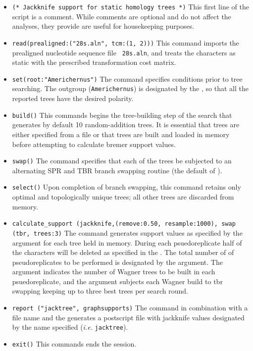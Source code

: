 \begin{itemize}
\item \texttt{(* Jackknife support for static homology trees *)} This first line of the script is a comment. While comments are optional and do not affect the analyses, they provide are useful for housekeeping purposes.
\item \texttt{read(prealigned:("28s.aln", tcm:(1, 2)))} This command imports the prealigned nucleotide sequence file \texttt{ 28s.aln}, and treats the characters as static with the prescribed transformation cost matrix.
\item \texttt{set(root:"Americhernus")} The  command specifies conditions prior to tree searching. The outgroup (\texttt{Americhernus}) is designated by the , so that all the reported trees have the desired polarity.     
\item \texttt{build()} This commands begins the tree-building step of the search that generates by default 10 random-addition trees.  It is essential that trees are either specified from a file or that trees are built and loaded in memory before attempting to calculate bremer support values.
\item \texttt{swap()} The  command specifies that each of the trees be subjected to an alternating SPR and TBR branch swapping routine (the default of \poy).
\item \texttt{select()} Upon completion of branch swapping, this command retains only optimal and topologically unique trees; all other trees are discarded from memory. 
\item \texttt{calculate\_support (jackknife,(remove:0.50, resample:1000), swap (tbr, trees:3)} The  command generates support values as specified by the  argument for each tree held in memory.  During each psuedoreplicate half of the characters will be deleted as specified in the .  The total number of of pseudoreplicates to be performed is designated by the  argument. The  argument indicates the number of Wagner trees to be built in each psuedoreplicate, and the  argument subjects each Wagner build to tbr swapping keeping up to three best trees per search round. 
\item \texttt{report ("jacktree", graphsupports)}  The  command in combination with a file name and the  generates a postscript file with jackknife values designated by the name specified (\emph{i.e.} \texttt{jacktree}). 
\item \texttt{exit()} This commands ends the \poy session.
\end{itemize}


